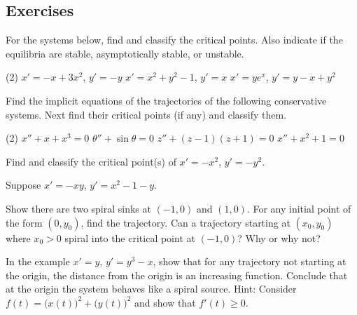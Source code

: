 \subsection{Exercises}

\begin{exercise}
For the systems below, find and classify the critical points.
Also indicate
if the equilibria are stable, asymptotically stable, or unstable.
\begin{tasks}(2)
\task $x'=-x+3x^2$, $y'=-y$
\task $x'=x^2+y^2-1$, $y'=x$
\task $x'=ye^x$, $y'=y-x+y^2$
\end{tasks}
\end{exercise}

\begin{exercise}
\pagebreak[2]
Find the implicit equations of the trajectories of the following
conservative systems.  Next find their critical points (if any) and classify them.
\begin{tasks}(2)
\task $x''+ x+x^3 = 0$
\task $\theta''+\sin \theta = 0$
\task $z''+ (z-1)(z+1) = 0$
\task $x''+ x^2+1 = 0$
\end{tasks}
\end{exercise}

\begin{exercise}
Find and classify the critical point(s) of $x' = -x^2$, $y' = -y^2$.
\end{exercise}

\begin{samepage}
\begin{exercise}
Suppose $x'=-xy$, $y'=x^2-1-y$.
\begin{tasks}
\task
Show there are two spiral sinks at
$(-1,0)$ and $(1,0)$.
\task
For any initial point of the form $(0,y_0)$, find the trajectory.
\task
Can a trajectory starting at $(x_0,y_0)$ where $x_0 > 0$ spiral into 
the critical point at $(-1,0)$?  Why or why not?
\end{tasks}
\end{exercise}
\end{samepage}

\begin{exercise} \label{exercise:increasing}
In the example $x'=y$, $y'=y^3-x$,
show that for any trajectory not starting at the origin,
the distance
from the origin is an increasing function.
Conclude
that at the origin the system behaves like a spiral source.
Hint: Consider $f(t) =
{\bigl(x(t)\bigr)}^2 + 
{\bigl(y(t)\bigr)}^2$ and show that $f'(t) \geq 0$.
\end{exercise}



